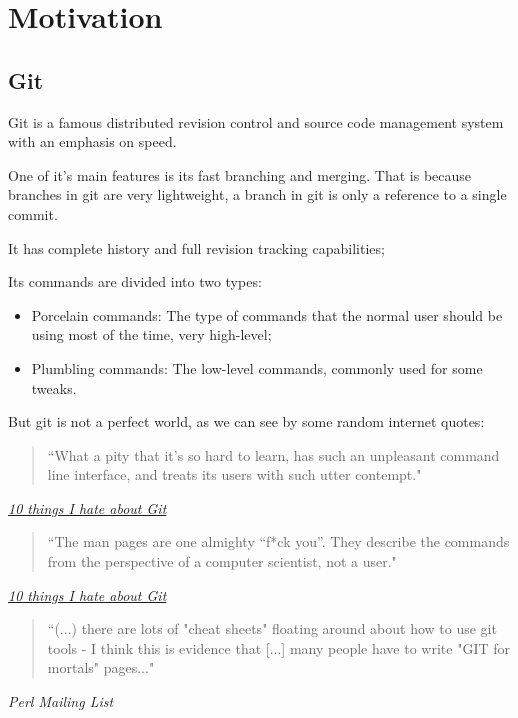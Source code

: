 %
%


\section{Motivation}
\subsection{Git}

 Git\cite{git} is a famous distributed revision control and source code
management system with an emphasis on speed.


One of it's main features is its fast branching and merging. That is because branches in git are very lightweight, a branch in git is only a reference to a single commit.


It has complete history and full revision tracking capabilities;


Its commands are divided into two types:
\begin{itemize}
\item Porcelain commands: The type of commands that the normal user should be using most of the time, very high-level;
\item Plumbling commands: The low-level commands, commonly used for some tweaks.
\end{itemize}

But git is not a perfect world, as we can see by some random internet quotes:

\begin{quote}
``What a pity that it’s so hard to learn, has such an unpleasant command line interface, and treats its users with such utter contempt."
\end{quote}
\begin{flushright}
\textit{\href{http://steveko.wordpress.com/2012/02/24/10-things-i-hate-about-git/}{10 things I hate about Git}}
\end{flushright}

\begin{quote}
``The man pages are one almighty “f*ck you”. They describe the commands from the perspective of a computer scientist, not a user."
\end{quote}
\begin{flushright}
\textit{\href{http://steveko.wordpress.com/2012/02/24/10-things-i-hate-about-git/}{10 things I hate about Git}}

\end{flushright}

\begin{quote}
``(...) there are lots of "cheat sheets" floating around about how to use git tools - I think this is evidence that [...] many
 people have to write "GIT for mortals" pages..."
\end{quote}
\begin{flushright}
\textit{Perl Mailing List}
\end{flushright}


